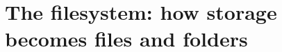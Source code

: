 \chapter{The filesystem: how storage becomes files and folders}
\label{ch:the-filesystem-how-storage-becomes}


